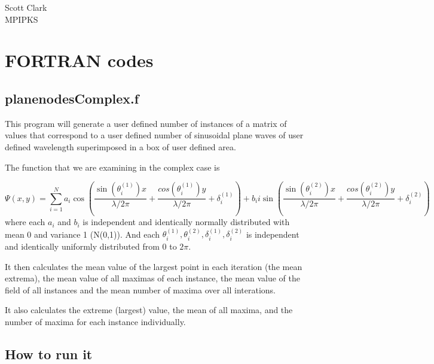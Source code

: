 \documentclass[12pt]{article}
\begin{document}
\begin{flushleft}
Scott Clark \\
MPIPKS
\end{flushleft}

\section{FORTRAN codes}

\subsection{planenodesComplex.f}

This program will generate a user defined number of instances of a matrix of values that correspond to a user defined number of sinusoidal plane waves of user defined wavelength superimposed in a box of user defined area.

The function that we are examining in the complex case is

\[\Psi(x,y) = \sum_{i = 1}^{N} a_{i} \cos \left(\frac{\sin(\theta_{i}^{(1)}) x}{\lambda/2 \pi} + \frac{cos(\theta_{i}^{(1)}) y}{\lambda/2 \pi} + \delta_{i}^{(1)} \right) + b_{i} i \sin \left(\frac{\sin(\theta_{i}^{(2)}) x}{\lambda/2 \pi} + \frac{cos(\theta_{i}^{(2)}) y}{\lambda/2 \pi} + \delta_{i}^{(2)} \right)\]
where each $a_{i}$ and $b_{i}$ is independent and identically normally distributed with mean 0 and variance 1 (N(0,1)). And each $\theta_{i}^{(1)}, \theta_{i}^{(2)}, \delta_{i}^{(1)}, \delta_{i}^{(2)}$ is independent and identically uniformly distributed from 0 to $2\pi$.

It then calculates the mean value of the largest point in each iteration (the mean extrema), the mean value of all maximas of each instance, the mean value of the field of all instances and the mean number of maxima over all interations.

It also calculates the extreme (largest) value, the mean of all maxima, and the number of maxima for each instance individually.

\subsection{How to run it}
\end{document}
